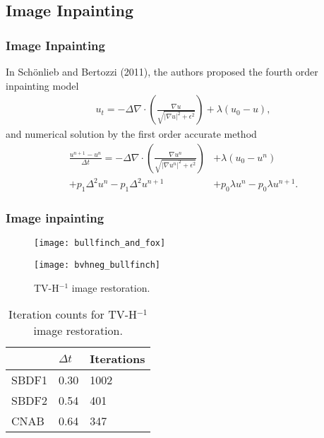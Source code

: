 \documentclass[hyperref={pdfpagelabels=false}]{beamer}
\begin{document}
\subsection{Image Inpainting} 
\begin{frame}
	\frametitle{Image Inpainting} 
	In Sch\"{o}nlieb and Bertozzi (2011), the authors proposed the fourth order inpainting model 
	\begin{align*}
	u_t = -\Delta \nabla \cdot\left( \frac{\nabla u}{\sqrt{\left\vert \nabla u \right\vert^2 + \epsilon^2}} \right) + \lambda (u_0 - u),
	\end{align*}
	and numerical solution by the first order accurate method 
	\begin{align*}
	\frac{u^{n+1} - u^n}{\Delta t} 
	=  -\Delta \nabla \cdot\left( \frac{\nabla u^n}{\sqrt{\left\vert \nabla u^n \right\vert^2 + \epsilon^2}} \right) &+ \lambda (u_0 - u^n) 
\\ +p_1\Delta^2u^n - p_1\Delta^2 u^{n+1} 
	&+ p_0\lambda u^n  - p_0\lambda u^{n+1}.
	\end{align*}
\end{frame}
\begin{frame}
	\frametitle{Image inpainting} 
	\begin{figure}
		\centering
\begin{minipage}{0.45\textwidth}
\centering
	\texttt{[image: bullfinch\_and\_fox]}
\end{minipage}
\begin{minipage}{0.45\textwidth}
\centering
        \texttt{[image: bvhneg\_bullfinch]}
\end{minipage}
\caption{TV-H$^{-1}$ image restoration.} 
	\end{figure}
\vspace{-15pt}
	\begin{table}[b]
		\centering 
	\caption{Iteration counts for TV-H$^{-1}$ image restoration.}
		\begin{tabular}{lll}
			\toprule 
			& $\Delta t$ & Iterations 
			\\ \midrule 
		SBDF1 & 0.30 & 1002 
		\\ 
		SBDF2 & 0.54 & 401 
		\\ 
		CNAB & 0.64 & 347
		\\ \bottomrule
		\end{tabular}
	\end{table} 
\end{frame}
\end{document}

